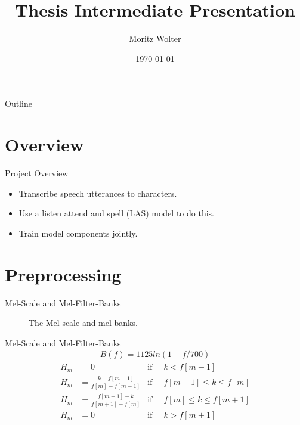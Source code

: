 \documentclass{beamer}
\title{Thesis Intermediate Presentation}
\author{Moritz Wolter}
\date{\today}
\begin{document}
\begin{frame}
  \titlepage
\end{frame}


\begin{frame}{Outline}
  \tableofcontents
\end{frame}

\section{Overview}
\begin{frame}{Project Overview}
	\begin{itemize}
		\item Transcribe speech utterances to characters. 
		\item Use a listen attend and spell (LAS) model to do this.
		\item Train model components jointly.
	\end{itemize}
\end{frame}



\section{Preprocessing}
\begin{frame}{Mel-Scale and Mel-Filter-Banks}
\begin{figure}
	
	
	\caption{The Mel scale and mel banks.}
	\label{fig:melBank}
\end{figure}
\end{frame}

\begin{frame}{Mel-Scale and Mel-Filter-Banks}
\begin{align}
	B(f) = 1125 ln(1 + f / 700)
\end{align}
\begin{align}
	H_m &= 0 				                       & \text{if}\;\; & k < f[m-1] \\
	H_m &= \frac{k      - f[m-1] }{f[m] - f[m-1]}  &\text{if}\;\; & f[m-1] \leq k \leq f[m] \\
	H_m &= \frac{f[m+1] - k      }{f[m + 1] - f[m]}&\text{if}\;\; & f[m] \leq k \leq f[m+1] \\
	H_m &= 0									   &\text{if}\;\; & k > f[m+1] 
\end{align}
\end{frame}
\end{document}
